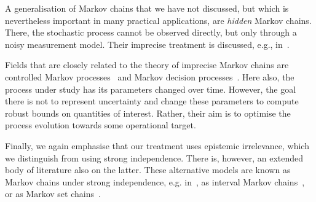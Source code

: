 \documentclass[graybox]{svmult}
\begin{document}
A generalisation of Markov chains that we have not discussed, but which is nevertheless important in many practical applications, are \emph{hidden} Markov chains. There, the stochastic process cannot be observed directly, but only through a noisy measurement model. Their imprecise treatment is discussed, e.g., in~\cite{benavoli2011,DeBock:2014ts,krak2017icthmc}.

Fields that are closely related to the theory of imprecise Markov chains are controlled Markov processes~\cite{guo:2003} and Markov decision processes~\cite{satia:1973, white:1994, itoh:2007, guo:2009}. Here also, the process under study has its parameters changed over time. However, the goal there is not to represent uncertainty and change these parameters to compute robust bounds on quantities of interest. Rather, their aim is to optimise the process evolution towards some operational target.

Finally, we again emphasise that our treatment uses epistemic irrelevance, which we distinguish from using strong independence. There is, however, an extended body of literature also on the latter. These alternative models are known as Markov chains under strong independence, e.g. in~\cite{augustin2013:itip}, as interval Markov chains~\cite{kozine:2002, skulj:2006, skulj:2007, galdino:2013}, or as Markov set chains~\cite{hartfiel:1991, hartfiel:1994, hartfiel:1998}.


\end{document}
